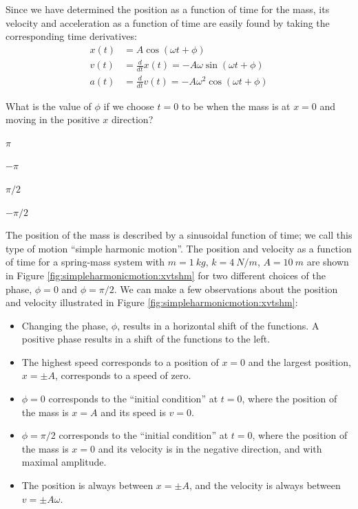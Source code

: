 Since we have determined the position as a function of time for the mass, its velocity and acceleration as a function of time are easily found by taking the corresponding time derivatives:
\begin{align*}
x(t) &= A \cos(\omega t + \phi)\\
v(t) &= \frac{d}{dt}x(t) = -A\omega\sin(\omega t + \phi)\\
a(t)&= \frac{d}{dt}v(t) = -A\omega^2\cos(\omega t + \phi)
\end{align*}

\begin{checkpoint}
\begin{MCquestion}{What is the value of $\phi$ if we choose $t=0$ to be when the mass is at $x=0$ and moving in the positive $x$ direction?}
\item $\pi$
\item $-\pi$
\item $\pi/2$
\item $-\pi/2$ \correct
\end{MCquestion}
\end{checkpoint}

The position of the mass is described by a sinusoidal function of time; we call this type of motion ``simple harmonic motion''. The position and velocity as a function of time for a spring-mass system with $m=\SI{1}{kg}$, $k=\SI{4}{N/m}$, $A=\SI{10}{m}$ are shown in Figure \ref{fig:simpleharmonicmotion:xvtshm} for two different choices of the phase, $\phi=0$ and $\phi=\pi/2$.
We can make a few observations about the position and velocity illustrated in Figure \ref{fig:simpleharmonicmotion:xvtshm}:
\begin{itemize}
\item Changing the phase, $\phi$, results in a horizontal shift of the functions. A positive phase results in a shift of the functions to the left.
\item The highest speed corresponds to a position of $x=0$ and the largest position, $x=\pm A$, corresponds to a speed of zero.
\item $\phi = 0$ corresponds to the ``initial condition'' at $t=0$, where the position of the mass is $x=A$ and its speed is $v=0$.
\item $\phi = \pi/2$ corresponds to the ``initial condition'' at $t=0$,  where the position of the mass is $x=0$ and its velocity is in the negative direction, and with maximal amplitude.
\item The position is always between $x=\pm A$, and the velocity is always between $v=\pm A\omega$.
\end{itemize}

